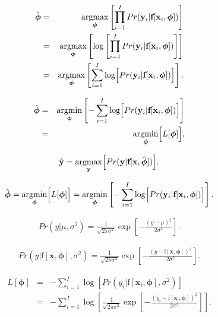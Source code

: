 \documentclass[letterpaper,twoside,openany, titlepage,oldfontcommands,titles,dvipsnames]{memoir}
\begin{document}
\begin{eqnarray}\label{eq:loss_max_like2}
  \hat{\boldsymbol\phi} &=& \mathop{\rm argmax}_{\boldsymbol\phi}\left[\prod_{i=1}^{I} Pr(\mathbf{y}_{i}|\mbox{\bf f}[\mathbf{x}_{i},\boldsymbol\phi])\right] \nonumber \\
  &=& \mathop{\rm argmax}_{\boldsymbol\phi}\left[\log\left[\prod_{i=1}^{I} Pr(\mathbf{y}_{i}|\mbox{\bf f}[\mathbf{x}_{i},\boldsymbol\phi])\right]\right]\nonumber \\
  &=& \mathop{\rm argmax}_{\boldsymbol\phi}\left[\sum_{i=1}^{I} \log\Bigl[Pr(\mathbf{y}_{i}|\mbox{\bf f}[\mathbf{x}_{i},\boldsymbol\phi])\Bigr]\right].
 \end{eqnarray}

\begin{eqnarray}
 \hat{\boldsymbol\phi} 
 &=& \mathop{\rm argmin}_{\boldsymbol\phi}\left[-\sum_{i=1}^{I} \log\Bigl[Pr(\mathbf{y}_{i}|\mbox{\bf f}[\mathbf{x}_{i},\boldsymbol\phi])\Bigr]\right]\nonumber \\
 &=& \mathop{\rm argmin}_{\boldsymbol\phi}\Bigl[L[\boldsymbol\phi]\Bigr],
 \end{eqnarray}

\begin{eqnarray}
  \hat{\mathbf{y}} = \mathop{\rm argmax}_{\mathbf{y}}\Bigl[Pr(\mathbf{y}|\mbox{\bf f}[\mathbf{x},\hat{\boldsymbol\phi}])\Bigr].
 \end{eqnarray}

\begin{eqnarray}
  \hat{\boldsymbol\phi} = \mathop{\rm argmin}_{\boldsymbol\phi}\Bigl[L[\boldsymbol\phi]\Bigr] = \mathop{\rm argmin}_{\boldsymbol\phi}\left[-\sum_{i=1}^{I} \log\Bigl[Pr(\mathbf{y}_{i}|\mbox{\bf f}[\mathbf{x}_{i},\boldsymbol\phi])\Bigr]\right].
  \end{eqnarray}

\begin{eqnarray}
  Pr(y|\mu,\sigma^2) = \frac{1}{\sqrt{2\pi\sigma^{2}}}\exp\left[-\frac{(y-\mu)^{2}}{2\sigma^{2}}\right].
 \end{eqnarray}

\begin{eqnarray}\label{eq:loss_pdf_uni_reg}
  Pr(y|\mbox{f}[\mathbf{x},\boldsymbol\phi],\sigma^2) = \frac{1}{\sqrt{2\pi\sigma^{2}}}\exp\left[-\frac{(y-\mbox{f}[\mathbf{x},\boldsymbol\phi])^{2}}{2\sigma^{2}}\right].
 \end{eqnarray}

\begin{eqnarray}\label{eq:loss_normal_full}
 L[\boldsymbol\phi] &=& -\sum_{i=1}^{I} \log\left[Pr(y_{i}|\mbox{f}[\mathbf{x}_{i},\boldsymbol\phi],\sigma^{2})\right]\nonumber \\
 &=&-\sum_{i=1}^{I} \log\left[\frac{1}{\sqrt{2\pi\sigma^{2}}}\exp\left[-\frac{(y_i-\mbox{f}[\mathbf{x}_i,\boldsymbol\phi])^{2}}{2\sigma^{2}}\right]\right].
 \end{eqnarray}
\end{document}
